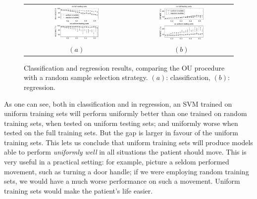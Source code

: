 \begin{figure}[!ht] \centering
  \begin{tabular}{cc}
    \includegraphics[width=0.45\textwidth]{figs/fig_rnVSuni1.eps} &
    \includegraphics[width=0.45\textwidth]{figs/fig_rnVSuni2.eps} \\
    $(a)$ & $(b)$ \\
  \end{tabular}
  \caption{Classification and regression results, comparing the OU
  procedure with a random sample selection strategy. $(a)$:
    classification, $(b)$: regression.}
  \label{fig:rnVSuni}
\end{figure}

As one can see, both in classification and in regression, an SVM
trained on uniform training sets will perform uniformly better than
one trained on random training sets, when tested on uniform testing
sets; and uniformly worse when tested on the full training sets. But
the gap is larger in favour of the uniform training sets. This lets us
conclude that uniform training sets will produce models able to
perform \emph{uniformly well} in all situations the patient should
move. This is very useful in a practical setting: for example, picture
a seldom performed movement, such as turning a door handle; if we were
employing random training sets, we would have a much worse performance
on such a movement. Uniform training sets would make the patient's
life easier.

